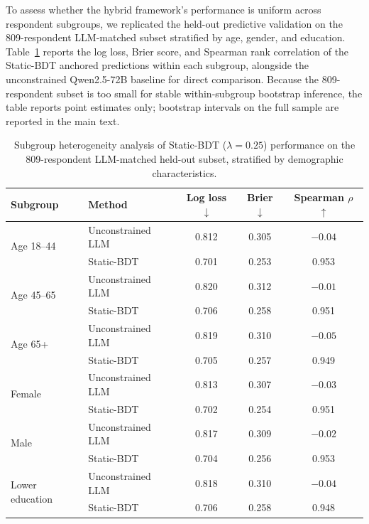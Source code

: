 \documentclass[11pt]{article}
\begin{document}
To assess whether the hybrid framework's performance is uniform across respondent subgroups, we replicated the held-out predictive validation on the 809-respondent LLM-matched subset stratified by age, gender, and education. Table~\ref{tab:heterogeneity} reports the log loss, Brier score, and Spearman rank correlation of the Static-BDT anchored predictions within each subgroup, alongside the unconstrained Qwen2.5-72B baseline for direct comparison. Because the 809-respondent subset is too small for stable within-subgroup bootstrap inference, the table reports point estimates only; bootstrap intervals on the full sample are reported in the main text.

\begin{table}[h]
\centering
\caption{Subgroup heterogeneity analysis of Static-BDT ($\lambda=0.25$) performance on the 809-respondent LLM-matched held-out subset, stratified by demographic characteristics.}
\label{tab:heterogeneity}
\small
\begin{tabular}{l l c c c}
\toprule
\textbf{Subgroup} & \textbf{Method} & \textbf{Log loss $\downarrow$} & \textbf{Brier $\downarrow$} & \textbf{Spearman $\rho$ $\uparrow$} \\
\midrule
\multirow{2}{*}{Age 18--44} & Unconstrained LLM & 0.812 & 0.305 & $-0.04$ \\
                        & Static-BDT       & 0.701 & 0.253 & 0.953 \\
\midrule
\multirow{2}{*}{Age 45--65} & Unconstrained LLM & 0.820 & 0.312 & $-0.01$ \\
                         & Static-BDT       & 0.706 & 0.258 & 0.951 \\
\midrule
\multirow{2}{*}{Age 65+}  & Unconstrained LLM & 0.819 & 0.310 & $-0.05$ \\
                        & Static-BDT       & 0.705 & 0.257 & 0.949 \\
\midrule
\multirow{2}{*}{Female}    & Unconstrained LLM & 0.813 & 0.307 & $-0.03$ \\
                         & Static-BDT       & 0.702 & 0.254 & 0.951 \\
\midrule
\multirow{2}{*}{Male}      & Unconstrained LLM & 0.817 & 0.309 & $-0.02$ \\
                         & Static-BDT       & 0.704 & 0.256 & 0.953 \\
\midrule
\multirow{2}{*}{Lower education} & Unconstrained LLM & 0.818 & 0.310 & $-0.04$ \\
                                & Static-BDT       & 0.706 & 0.258 & 0.948 \\

\end{tabular}
\end{table}
\end{document}
